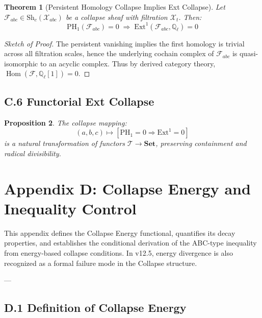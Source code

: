 \documentclass[11pt]{article}
\newtheorem{theorem}{Theorem}[section]
\newtheorem{proposition}[theorem]{Proposition}
\begin{document}
\begin{theorem}[Persistent Homology Collapse Implies Ext Collapse]
Let \( \mathcal{F}_{abc} \in \mathrm{Sh}_c(\mathcal{X}_{abc}) \) be a collapse sheaf with filtration \( \mathcal{X}_t \).  
Then:
\[
\mathrm{PH}_1(\mathcal{F}_{abc}) = 0 \;\Rightarrow\; \mathrm{Ext}^1(\mathcal{F}_{abc}, \mathbb{Q}_\ell) = 0
\]
\end{theorem}

\begin{proof}[Sketch of Proof]
The persistent vanishing implies the first homology is trivial across all filtration scales, hence  
the underlying cochain complex of \( \mathcal{F}_{abc} \) is quasi-isomorphic to an acyclic complex.  
Thus by derived category theory, \( \operatorname{Hom}(\mathcal{F}, \mathbb{Q}_\ell[1]) = 0 \).
\end{proof}

\subsection*{C.6 Functorial Ext Collapse}

\begin{proposition}
The collapse mapping:
\[
(a,b,c) \mapsto \left[ \mathrm{PH}_1 = 0 \Rightarrow \mathrm{Ext}^1 = 0 \right]
\]
is a natural transformation of functors \( \mathcal{T} \to \mathbf{Set} \), preserving containment and radical divisibility.
\end{proposition}


\section*{Appendix D: Collapse Energy and Inequality Control}

This appendix defines the Collapse Energy functional, quantifies its decay properties,  
and establishes the conditional derivation of the ABC-type inequality from energy-based collapse conditions.  
In v12.5, energy divergence is also recognized as a formal failure mode in the Collapse structure.

---

\subsection*{D.1 Definition of Collapse Energy}
\end{document}
